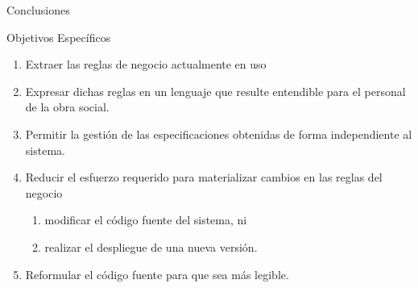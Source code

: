 \documentclass[10pt]{beamer}
\begin{document}
\begin{frame}{Conclusiones}
    \begin{block}{Objetivos Específicos}
        \begin{enumerate}
            \item Extraer las reglas de negocio actualmente en uso
            \item Expresar dichas reglas en un lenguaje que resulte entendible para el personal de la obra social.
            \item Permitir la gestión de las especificaciones obtenidas de forma independiente al sistema.
            \item Reducir el esfuerzo requerido para materializar cambios en las reglas del negocio
            \begin{enumerate}
                \item modificar el código fuente del sistema, ni
                \item realizar el despliegue de una nueva versión.
            \end{enumerate}
            \item Reformular el código fuente para que sea más legible.
        \end{enumerate}
    \end{block}
\end{frame}

\end{document}
